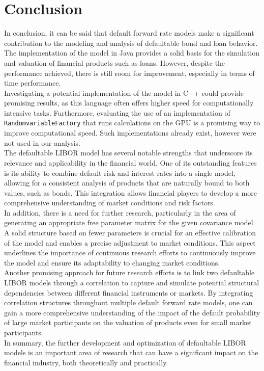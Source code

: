 \documentclass[12pt]{article}
\begin{document}
	\section{Conclusion}\label{sec:conclusion}
	In conclusion, it can be said that default forward rate models make a significant contribution to the modeling and analysis of defaultable bond and loan behavior. The implementation of the model in Java provides a solid basis for the simulation and valuation of financial products such as loans. However, despite the performance achieved, there is still room for improvement, especially in terms of time performance.\\
	Investigating a potential implementation of the model in C++ could provide promising results, as this language often offers higher speed for computationally intensive tasks. Furthermore, evaluating the use of an implementation of \texttt{RandomvariableFactory} that runs calculations on the GPU is a promising way to improve computational speed. Such implementations already exist, however were not used in our analysis.\\
	The defaultable LIBOR model has several notable strengths that underscore its relevance and applicability in the financial world. One of its outstanding features is its ability to combine default risk and interest rates into a single model, allowing for a consistent analysis of products that are naturally bound to both values, such as bonds. This integration allows financial players to develop a more comprehensive understanding of market conditions and risk factors.\\
	In addition, there is a need for further research, particularly in the area of generating an appropriate free parameter matrix for the given covariance model. A solid structure based on fewer parameters is crucial for an effective calibration of the model and enables a precise adjustment to market conditions. This aspect underlines the importance of continuous research efforts to continuously improve the model and ensure its adaptability to changing market conditions.\\
	Another promising approach for future research efforts is to link two defaultable LIBOR models through a correlation to capture and simulate potential structural dependencies between different financial instruments or markets.
	By integrating correlation structures throughout multiple default forward rate models, one can gain a more comprehensive understanding of the impact of the default probability of large market participants on the valuation of products even for small market participants.\\
	In summary, the further development and optimization of defaultable LIBOR models is an important area of research that can have a significant impact on the financial industry, both theoretically and practically.
	
\end{document}
